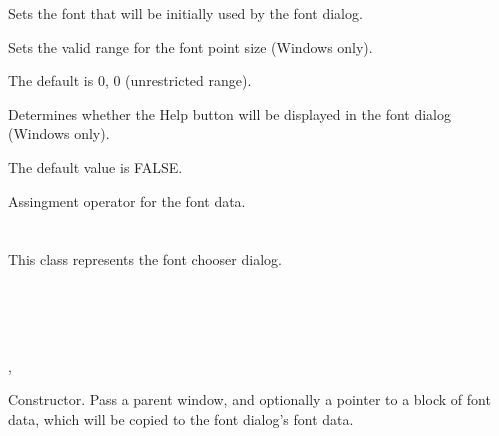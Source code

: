 
Sets the font that will be initially used by the font dialog.



Sets the valid range for the font point size (Windows only).

The default is 0, 0 (unrestricted range).



Determines whether the Help button will be displayed in the font dialog (Windows only).

The default value is FALSE.



Assingment operator for the font data.

\section{}\label{wxfontdialog}

This class represents the font chooser dialog.


\\
\\
\\


, 




Constructor. Pass a parent window, and optionally a pointer to a block of font
data, which will be copied to the font dialog's font data.


